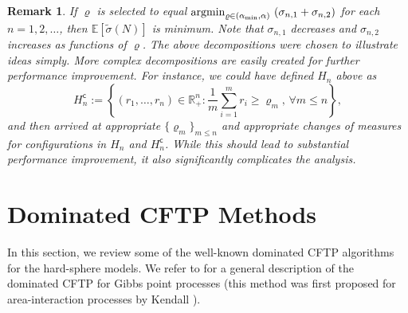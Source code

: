 \documentclass[11pt]{article}
\newcommand{\ee}{\mathbb{E}}
\newcommand{\reals}{\mathbb{R}}
\newcommand{\lt}{\left}
\newcommand{\rt}{\right}
\newcommand{\wt}{\widetilde}
\newcommand{\argmin}{\operatornamewithlimits{argmin}}
\newtheorem{remark}{Remark}
\begin{document}
\begin{remark}
\normalfont
If $\varrho$ is selected to equal
$\argmin_{\varrho \in (\alpha_{\min}, \alpha)} \,\, (\sigma_{n,1} + \sigma_{n,2})$ for each $n =  1, 2, \dots$, then $\ee\lt[\wt  \sigma(N)\rt]$ is minimum.  Note that   $\sigma_{n,1}$ decreases and $\sigma_{n,2}$ increases as functions of $\varrho$.
The above decompositions were chosen to illustrate ideas simply. More complex decompositions are easily created for further performance improvement. For instance, we could have defined $H_n$ above as
$$H^{\mathsf{c}}_n := \lt\{ (r_1, \dots, r_{n}) \in \reals_+^{n}: \frac{1}{m}\sum_{i= 1}^{m} r_i \geq \varrho_m, \,\forall m \leq n \rt\},$$
and then arrived at appropriate $\{\varrho_m\}_{m \leq n}$ and appropriate changes of measures
for configurations in  $H_n$ and  $H_n^{\mathsf{c}}$. While this should lead to substantial performance improvement,
it also significantly  complicates the analysis.
\end{remark}

\section{Dominated CFTP Methods}
\label{sec:dcftp}
In this section, we review some of the well-known dominated CFTP algorithms for the hard-sphere models. 
We refer to  \cite{KM00} for a general description of  the dominated CFTP for Gibbs point processes (this method was first proposed for area-interaction processes by Kendall \cite{KW98}).\\
\end{document}
